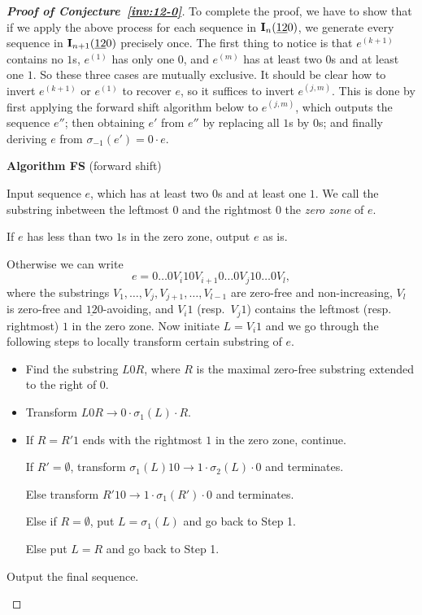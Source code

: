 \documentclass[12pt,A4]{amsart}
\numberwithin{equation}{section}
\theoremstyle{plain}
\theoremstyle{definition}
\def\I{\operatorname{{\bf I}}}
\begin{document}
\begin{proof}[{\bf Proof of Conjecture~\ref{inv:12-0}}]
To complete the proof, we have to show that if we apply the above process for each sequence in $\I_{n}(\underline{12}0)$, we generate every sequence in $\I_{n+1}(\underline{12}0)$ precisely once. The first thing to notice is that $e^{(k+1)}$ contains no $1$s, $e^{(1)}$ has only one $0$, and $e^{(m)}$ has at least two $0$s and at least one $1$. So these three cases are mutually exclusive. It should be clear how to invert $e^{(k+1)}$ or $e^{(1)}$ to recover $e$, so it suffices to invert $e^{(j,m)}$. This is done by first applying the forward shift algorithm below to $e^{(j,m)}$, which outputs the sequence $e''$; then obtaining  $e'$ from $e''$ by replacing all $1$s by $0$s; and finally  deriving $e$ from $\sigma_{-1}(e')=0\cdot e$.
\begin{framed}
\begin{center}
 {\bf Algorithm FS} (forward shift)
\end{center}
\noindent Input sequence $e$, which has at least two $0$s and at least one $1$. We call the substring inbetween the leftmost $0$ and the rightmost $0$ the {\em zero zone} of $e$.

If $e$ has less than two $1$s in the zero zone, output $e$ as is.

Otherwise we can write $$e=0\ldots0V_i 10V_{i+1}0\ldots 0V_j10\ldots0V_{l},$$ where the substrings $V_1,\ldots,V_{j},V_{j+1},\ldots,V_{l-1}$ are zero-free and non-increasing, $V_{l}$ is zero-free and $\underline{12}0$-avoiding, and  $V_i1$  (resp.~$V_j1$) contains the leftmost (resp. rightmost) $1$ in the zero zone. Now initiate $L=V_i1$ and we go through the following steps to locally transform certain substring of $e$. 
\begin{itemize}
	\item[Step 1] Find the substring $L 0 R$, where $R$ is the maximal zero-free substring extended to the right of $0$.
	\item[Step 2] Transform $L 0 R\rightarrow 0\cdot\sigma_{1}(L)\cdot R$. 
    \item[Step 3] If $R=R'1$ ends with the rightmost $1$ in the zero zone, continue.

    If $R'=\emptyset$, transform $\sigma_1(L)10\rightarrow 1\cdot\sigma_{2}(L)\cdot0$ and terminates.

    Else transform $R'10\rightarrow 1\cdot\sigma_{1}(R')\cdot0$ and terminates.

    \noindent Else if $R=\emptyset$, put $L=\sigma_1(L)$ and go back to Step 1.

    \noindent Else put $L=R$ and go back to Step 1.
\end{itemize}
\noindent Output the final sequence.


\end{framed}
\end{proof}
\end{document}
